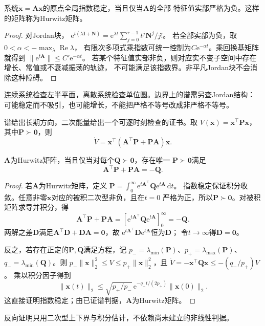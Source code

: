 \begin{theorem}[连续线性系统的指数稳定性]
  \label{thm:dynamical-continuous-spectral-stability}
  系统$\dot{\bm x}=\bm A\bm x$的原点全局指数稳定，当且仅当$\bm A$的全部
  特征值实部严格为负。这样的矩阵称为Hurwitz矩阵。
\end{theorem}
\begin{proof}
  对Jordan块，
  $\mathrm e^{t(\lambda\bm I+\bm N)}
   =\mathrm e^{\lambda t}\sum_{j=0}^{r-1}t^j\bm N^j/j!$。
  若全部实部为负，取$0<\alpha<-\max_\lambda\operatorname{Re}\lambda$，
  有限次多项式乘指数可统一控制为$C\mathrm e^{-\alpha t}$。乘回换基矩阵就得到
  $\|\mathrm e^{t\bm A}\|\leq C'\mathrm e^{-\alpha t}$。
  若某个特征值实部非负，则对应实不变子空间中存在增长、常值或不衰减振荡的轨迹，
  不可能满足该指数界。非平凡Jordan块不会消除这种障碍。
\end{proof}
连续系统检查左半平面，离散系统检查单位圆。边界上的谱需另查Jordan结构：
可能稳定而不吸引，也可能增长，不能把严格不等号改成非严格不等号。

谱给出长期方向，二次能量给出一个可逐时刻检查的证书。取
$V(\bm x)=\bm x^\top\bm P\bm x$，其中$\bm P\succ\bm0$，则
\begin{equation}
  \dot V=\bm x^\top(\bm A^\top\bm P+\bm P\bm A)\bm x.
  \label{eq:dynamical-continuous-lyapunov-derivative}
\end{equation}
\begin{theorem}[线性Lyapunov方程]
  \label{thm:dynamical-linear-lyapunov-equation}
  $\bm A$为Hurwitz矩阵，当且仅当对每个$\bm Q\succ\bm0$，存在唯一
  $\bm P\succ\bm0$满足
  \begin{equation}
    \bm A^\top\bm P+\bm P\bm A=-\bm Q.
    \label{eq:dynamical-continuous-lyapunov-equation}
  \end{equation}
\end{theorem}
\begin{proof}
  若$\bm A$为Hurwitz矩阵，定义
  $\bm P=\int_0^\infty\mathrm e^{t\bm A^\top}\bm Q\mathrm e^{t\bm A}\,\mathrm dt$。
  指数稳定保证积分收敛。任意非零$\bm x$对应的被积二次型非负，且在$t=0$
  严格为正，所以$\bm P\succ\bm0$。对被积矩阵求导并积分，得
  \[
    \bm A^\top\bm P+\bm P\bm A
    =[\mathrm e^{t\bm A^\top}\bm Q\mathrm e^{t\bm A}]_0^\infty=-\bm Q.
  \]
  两解之差$\bm D$满足$\bm A^\top\bm D+\bm D\bm A=\bm0$，故
  $\mathrm e^{t\bm A^\top}\bm D\mathrm e^{t\bm A}$恒为$\bm D$；
  令$t\to\infty$得$\bm D=\bm0$。

  反之，若存在正定的$\bm P,\bm Q$满足方程，记
  $p_-=\lambda_{\min}(\bm P)$、$p_+=\lambda_{\max}(\bm P)$、
  $q_-=\lambda_{\min}(\bm Q)$。则
  $p_-\|\bm x\|_2^2\leq V\leq p_+\|\bm x\|_2^2$，且
  $\dot V=-\bm x^\top\bm Q\bm x\leq-(q_-/p_+)V$。
  乘以积分因子得到
  \[
    \|\bm x(t)\|_2
    \leq\sqrt{p_+/p_-}\,
      \mathrm e^{-q_-t/(2p_+)}\|\bm x(0)\|_2.
  \]
  这直接证明指数稳定；由已证谱判据，$\bm A$为Hurwitz矩阵。
\end{proof}
反向证明只用二次型上下界与积分估计，不依赖尚未建立的非线性判据。

